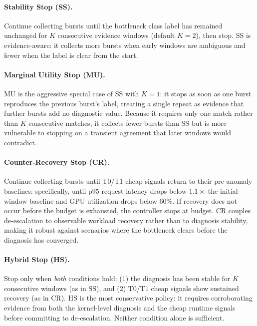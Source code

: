 \paragraph{Stability Stop (\textsc{SS}).}
Continue collecting bursts until the bottleneck class label has remained unchanged for $K$ consecutive evidence windows (default $K=2$), then stop. \textsc{SS} is evidence-aware: it collects more bursts when early windows are ambiguous and fewer when the label is clear from the start.

\paragraph{Marginal Utility Stop (\textsc{MU}).}
\textsc{MU} is the aggressive special case of \textsc{SS} with $K=1$: it stops as soon as one burst reproduces the previous burst's label, treating a single repeat as evidence that further bursts add no diagnostic value. Because it requires only one match rather than $K$ consecutive matches, it collects fewer bursts than \textsc{SS} but is more vulnerable to stopping on a transient agreement that later windows would contradict.

\paragraph{Counter-Recovery Stop (\textsc{CR}).}
Continue collecting bursts until T0/T1 cheap signals return to their pre-anomaly baselines: specifically, until p95 request latency drops below $1.1\times$ the initial-window baseline and GPU utilization drops below 60\%. If recovery does not occur before the budget is exhausted, the controller stops at budget. \textsc{CR} couples de-escalation to observable workload recovery rather than to diagnosis stability, making it robust against scenarios where the bottleneck clears before the diagnosis has converged.

\paragraph{Hybrid Stop (\textsc{HS}).}
Stop only when \emph{both} conditions hold: (1) the diagnosis has been stable for $K$ consecutive windows (as in \textsc{SS}), and (2) T0/T1 cheap signals show sustained recovery (as in \textsc{CR}). \textsc{HS} is the most conservative policy: it requires corroborating evidence from both the kernel-level diagnosis and the cheap runtime signals before committing to de-escalation. Neither condition alone is sufficient.

